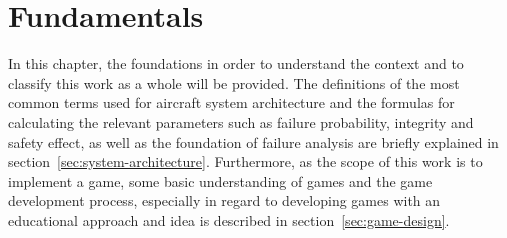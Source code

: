 
\chapter{Fundamentals}\label{ch:fundamentals}
In this chapter, the foundations in order to understand the context and to classify this work as a whole will be provided.
The definitions of the most common terms used for aircraft system architecture and the formulas for calculating the relevant
parameters such as failure probability, integrity and safety effect, as well as the foundation of failure analysis are briefly explained in section~\ref{sec:system-architecture}.
Furthermore, as the scope of this work is to implement a game, some basic understanding of games and the game development process, especially in regard
to developing games with an educational approach and idea is described in
section~\ref{sec:game-design}.


